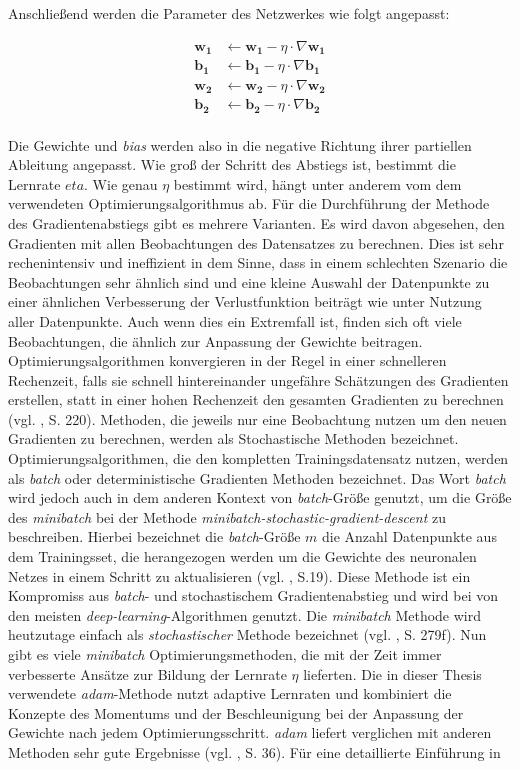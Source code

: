 \documentclass[a4paper,11pt]{article}
\begin{document}
Anschließend werden die Parameter des Netzwerkes wie folgt angepasst:

\begin{align*}
   \bm{w_1} &\leftarrow \bm{w_1} - \eta \cdot \nabla \bm{w_1} \\
\bm{b_1} &\leftarrow \bm{b_1} - \eta \cdot \nabla \bm{b_1} \\
 \bm{w_2} &\leftarrow \bm{w_2} - \eta \cdot \nabla \bm{w_2} \\
    \bm{b_2} &\leftarrow \bm{b_2} - \eta \cdot \nabla \bm{b_2} \\
\end{align*}{}

Die Gewichte und \textit{bias} werden also in die negative Richtung ihrer partiellen Ableitung angepasst. Wie groß der Schritt des Abstiegs ist, bestimmt die Lernrate $eta$. 
Wie genau $\eta$ bestimmt wird, hängt unter anderem vom dem verwendeten Optimierungsalgorithmus ab. Für die Durchführung der Methode des Gradientenabstiegs gibt es mehrere Varianten. Es wird davon abgesehen, den Gradienten mit allen Beobachtungen des Datensatzes zu berechnen. Dies ist sehr rechenintensiv und ineffizient in dem Sinne, dass in einem schlechten Szenario die Beobachtungen sehr ähnlich sind und eine kleine Auswahl der Datenpunkte zu einer ähnlichen Verbesserung der Verlustfunktion beiträgt wie unter Nutzung aller Datenpunkte. Auch wenn dies ein Extremfall ist, finden sich oft viele Beobachtungen, die ähnlich zur Anpassung der Gewichte beitragen. Optimierungsalgorithmen konvergieren in der Regel in einer schnelleren Rechenzeit, falls sie schnell hintereinander ungefähre Schätzungen des Gradienten erstellen, statt in einer hohen Rechenzeit den gesamten Gradienten zu berechnen (vgl. \cite{deepEssentials}, S. 220). Methoden, die jeweils nur eine Beobachtung nutzen um den neuen Gradienten zu berechnen, werden als Stochastische Methoden bezeichnet. Optimierungsalgorithmen, die den kompletten Trainingsdatensatz nutzen, werden als \textit{batch} oder deterministische Gradienten Methoden bezeichnet. Das Wort \textit{batch} wird jedoch auch in dem anderen Kontext von \textit{batch}-Größe genutzt, um die Größe des \textit{minibatch} bei der Methode \textit{minibatch-stochastic-gradient-descent} zu beschreiben. Hierbei bezeichnet die \textit{batch}-Größe $m$ die Anzahl Datenpunkte aus dem Trainingsset, die herangezogen werden um die Gewichte des neuronalen Netzes in einem Schritt zu aktualisieren (vgl. \cite{keras}, S.19). Diese Methode ist ein Kompromiss aus \textit{batch}- und stochastischem Gradientenabstieg und wird bei von den meisten \textit{deep-learning}-Algorithmen genutzt. Die \textit{minibatch} Methode wird heutzutage einfach als \textit{stochastischer} Methode bezeichnet (vgl. \cite{deepL}, S. 279f). Nun gibt es viele \textit{minibatch} Optimierungsmethoden, die mit der Zeit immer verbesserte Ansätze zur Bildung der Lernrate $\eta$ lieferten. Die in dieser Thesis verwendete \textit{adam}-Methode nutzt adaptive Lernraten und kombiniert die Konzepte des Momentums und der Beschleunigung bei der Anpassung der Gewichte nach jedem Optimierungsschritt. \textit{adam} liefert verglichen mit anderen Methoden sehr gute Ergebnisse (vgl. \cite{keras}, S. 36). Für eine detaillierte Einführung in 
\end{document}
